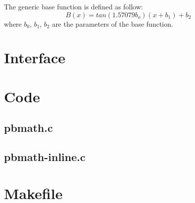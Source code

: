 The generic base function is defined as follow:\\
\begin{equation}
B(x)=tan(1.57079b_o)(x+b_1)+b_2
\end{equation}
where $b_0$, $b_1$, $b_2$ are the parameters of the base function.

\section{Interface}

\begin{scriptsize}
\begin{ttfamily}

\end{ttfamily}
\end{scriptsize}

\section{Code}

\subsection{pbmath.c}

\begin{scriptsize}
\begin{ttfamily}

\end{ttfamily}
\end{scriptsize}

\subsection{pbmath-inline.c}

\begin{scriptsize}
\begin{ttfamily}

\end{ttfamily}
\end{scriptsize}

\section{Makefile}

\begin{scriptsize}
\begin{ttfamily}

\end{ttfamily}
\end{scriptsize}

